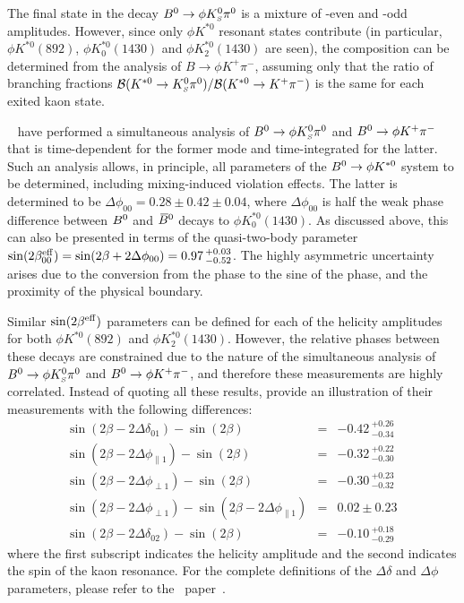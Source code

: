 \label{sec:cp_uta:qqs:vv}

The final state in the decay $B^0 \to \phi K^0_{\scriptscriptstyle S} \pi^0$ is a mixture of \CP-even
and \CP-odd amplitudes. However, since only $\phi K^{*0}$ resonant states
contribute (in particular, $\phi K^{*0}(892)$, $\phi K^{*0}_0(1430)$ and $\phi
K^{*0}_2(1430)$ are seen), the composition can be determined from the analysis
of $B \to \phi K^+ \pi^-$, assuming only that the ratio of branching fractions
${\cal B}(K^{*0} \to K^0_{\scriptscriptstyle S} \pi^0)/{\cal B}(K^{*0} \to K^+ \pi^-)$ is the same
for each exited kaon state. 

\babar~\cite{Aubert:2008zza} have performed a simultaneous analysis of 
$B^0 \to \phi K^0_{\scriptscriptstyle S} \pi^0$ and $B^0 \to \phi K^+ \pi^-$ that is time-dependent
for the former mode and time-integrated for the latter. Such an analysis
allows, in principle, all parameters of the $B^0 \to \phi K^{*0}$ system to be
determined, including mixing-induced \CP violation effects. The latter is
determined to be $\Delta\phi_{00} = 0.28 \pm 0.42 \pm 0.04$, where
$\Delta\phi_{00}$ is half the weak phase difference between $B^0$ and $\kern 0.18em\overline{\kern -0.18em B}{}^0$
decays to $\phi K^{*0}_0(1430)$. As discussed above, this can also be
presented in terms of the quasi-two-body parameter $\sin(2\beta^{\rm eff}_{00}) =
\sin(2\beta+2\Delta\phi_{00}) = 0.97 \,^{+0.03}_{-0.52}$. The highly asymmetric
uncertainty arises due to the conversion from the phase to the sine of the
phase, and the proximity of the physical boundary. 

Similar $\sin(2\beta^{\rm eff})$ parameters can be defined for each of the
helicity amplitudes for both $\phi K^{*0}(892)$ and $\phi
K^{*0}_2(1430)$. However, the relative phases between these decays are
constrained due to the nature of the simultaneous analysis of $B^0 \to \phi
K^0_{\scriptscriptstyle S} \pi^0$ and $B^0 \to \phi K^+ \pi^-$, and therefore these measurements are
highly correlated. Instead of quoting all these results, \babar provide an
illustration of their measurements with the following differences: 
\begin{eqnarray}
  \sin(2\beta - 2\Delta\delta_{01}) - \sin(2\beta) & = & -0.42\,^{+0.26}_{-0.34} \, \\
  \sin(2\beta - 2\Delta\phi_{\parallel1}) - \sin(2\beta) & = & -0.32\,^{+0.22}_{-0.30} \, \\
  \sin(2\beta - 2\Delta\phi_{\perp1}) - \sin(2\beta) & = & -0.30\,^{+0.23}_{-0.32} \, \\
  \sin(2\beta - 2\Delta\phi_{\perp1}) - \sin(2\beta - 2\Delta\phi_{\parallel1})
  & = & 0.02 \pm 0.23 \, \\
  \sin(2\beta - 2\Delta\delta_{02}) - \sin(2\beta) & = & -0.10\,^{+0.18}_{-0.29} \,
\end{eqnarray}
where the first subscript indicates the helicity amplitude and the second
indicates the spin of the kaon resonance. For the complete definitions of the
$\Delta\delta$ and $\Delta\phi$ parameters, please refer to the \babar\ paper~\cite{Aubert:2008zza}.

